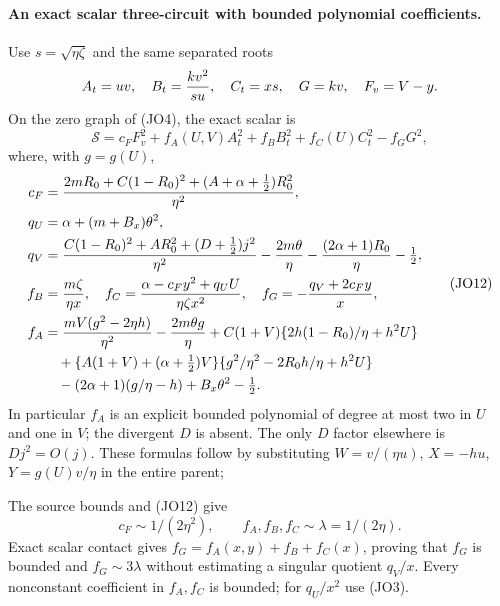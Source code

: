 \paragraph{An exact scalar three-circuit with bounded polynomial coefficients.}
Use $s=\sqrt{\eta\zeta}$ and the same separated roots
\[
 A_t=uv,\quad B_t={kv^2\over su},\quad C_t=xs,\quad
 G=kv,\quad F_v=V-y.
\]
On the zero graph of (JO4), the exact scalar is
\[
 \mathcal S=c_FF_v^2+f_A(U,V)A_t^2+f_BB_t^2+
                       f_C(U)C_t^2-f_GG^2,            \tag{JO11}
\]
where, with $g=g(U)$,
\[
 \begin{aligned}
 c_F&={2mR_0+C(1-R_0)^2+(A+\alpha+\tfrac12)R_0^2\over\eta^2},\\
 q_U&=\alpha+(m+B_x)\theta^2,\\
 q_V&={C(1-R_0)^2+AR_0^2+(D+\tfrac12)j^2\over\eta^2}
       -{2m\theta\over\eta}-{(2\alpha+1)R_0\over\eta}-\tfrac12,\\
 f_B&={m\zeta\over\eta x},\quad
 f_C={\alpha-c_Fy^2+q_UU\over\eta\zeta x^2},\quad
 f_G=-{q_V+2c_Fy\over x},                              \\
 f_A&={mV(g^2-2\eta h)\over\eta^2}-{2m\theta g\over\eta}
       +C(1+V)\{2h(1-R_0)/\eta+h^2U\}\\
 &\quad+\{A(1+V)+(\alpha+\tfrac12)V\}
                   \{g^2/\eta^2-2R_0h/\eta+h^2U\}\\
 &\quad-(2\alpha+1)(g/\eta-h)+B_x\theta^2-\tfrac12 .
 \end{aligned} \tag{JO12}
\]
In particular $f_A$ is an explicit bounded polynomial of degree at
most two in $U$ and one in $V$; the divergent $D$ is absent.
The only $D$ factor elsewhere is $Dj^2=O(j)$. These formulas
follow by substituting $W=v/(\eta u)$, $X=-hu$, $Y=g(U)v/\eta$
in the entire parent; 

The source bounds and (JO12) give
\[
 c_F\sim1/(2\eta^2),\qquad
 f_A,f_B,f_C\sim\lambda=1/(2\eta).
\]
Exact scalar contact gives
$f_G=f_A(x,y)+f_B+f_C(x)$, proving that $f_G$ is bounded
and $f_G\sim3\lambda$ without estimating a singular quotient
$q_V/x$. Every nonconstant coefficient in $f_A,f_C$ is bounded;
for $q_U/x^2$ use (JO3).

